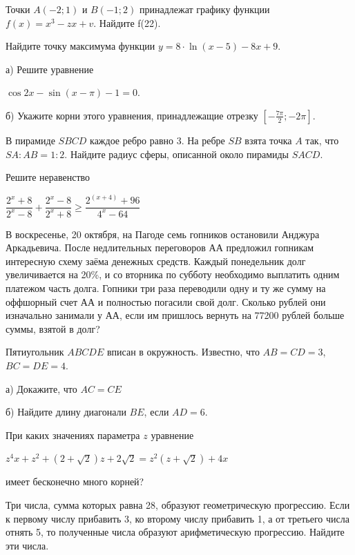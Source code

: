  Точки $A(-2;1)$ и $B(-1;2)$ принадлежат графику функции $f(x)=x^3-zx+v$. Найдите f(22).

 Найдите точку максимума функции $y=8\cdot \ln{(x-5)} - 8x + 9$.

 а) Решите уравнение 

$\cos{2x}-\sin{(x-\pi)} - 1 = 0$.

б) Укажите корни этого уравнения, принадлежащие отрезку $[-\frac{7\pi}{2};-2\pi]$.

 В пирамиде $SBCD$ каждое ребро равно 3. На ребре $SB$ взята точка $A$ так, что $SA:AB=1:2$. Найдите радиус сферы, описанной около пирамиды $SACD$.


 Решите неравенство

$ \dfrac{2^x+8}{2^x-8} + \dfrac{2^x-8}{2^x+8} \geq \dfrac{2^{(x+4)}+96}{4^x-64}$

 В воскресенье, 20 октября, на Пагоде семь гопников остановили Анджура Аркадьевича. После недлительных переговоров АА предложил гопникам интересную схему заёма денежных средств. Каждый понедельник долг увеличивается на 20\%, и со вторника по субботу необходимо выплатить одним платежом часть долга. Гопники три раза переводили одну и ту же сумму на оффшорный счет АА и полностью погасили свой долг. Сколько рублей они изначально занимали у АА, если им пришлось вернуть на 77200 рублей больше суммы, взятой в долг?

 Пятиугольник $ABCDE$ вписан в окружность. Известно, что $AB=CD=3$, $BC=DE=4$.

а) Докажите, что $AC=CE$

б) Найдите длину диагонали $BE$, если $AD=6$.

 При каких значениях параметра $z$ уравнение

$z^4x + z^2 +(2+\sqrt{2})z + 2\sqrt{2}=z^2(z+\sqrt{2})+4x$

имеет бесконечно много корней?

 Три числа, сумма которых равна 28, образуют геометрическую прогрессию. Если к первому числу прибавить 3, ко второму числу прибавить 1, а от третьего числа отнять 5, то полученные числа образуют арифметическую прогрессию. Найдите эти числа.


